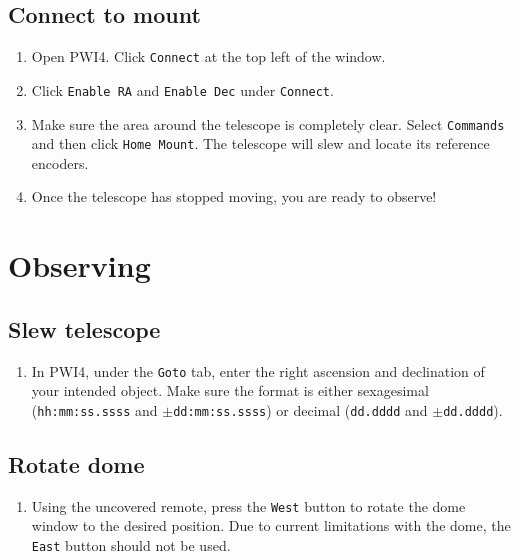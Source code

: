 \documentclass{article}
\begin{document}
	\subsection{Connect to mount}
	\label{sec:connect-to-mount}
	
	\begin{enumerate}
		
		\item Open PWI4. Click \texttt{Connect} at the top left of the window.
		
		\item Click \texttt{Enable RA} and \texttt{Enable Dec} under \texttt{Connect}.
		
		\item Make sure the area around the telescope is completely clear. Select \texttt{Commands} and then click \texttt{Home Mount}. The telescope will slew and locate its reference encoders.
		
		\item Once the telescope has stopped moving, you are ready to observe!
		
	\end{enumerate}
	
	\newpage
	\section{Observing}
	\label{sec:observing}
	
	\subsection{Slew telescope}
	\label{sec:slew-telescope}
	
	\begin{enumerate}
		
		\item In PWI4, under the \texttt{Goto} tab, enter the right ascension and declination of your intended object. Make sure the format is either sexagesimal (\texttt{hh:mm:ss.ssss} and \texttt{$\pm$dd:mm:ss.ssss}) or decimal (\texttt{dd.dddd} and \texttt{$\pm$dd.dddd}).
		
	\end{enumerate}

	\subsection{Rotate dome}
	\label{sec:rotate-dome}
	
	\begin{enumerate}
		
		\item Using the uncovered remote, press the \texttt{West} button to rotate the dome window to the desired position. Due to current limitations with the dome, the \texttt{East} button should not be used.
		
	\end{enumerate}
	
\end{document}
